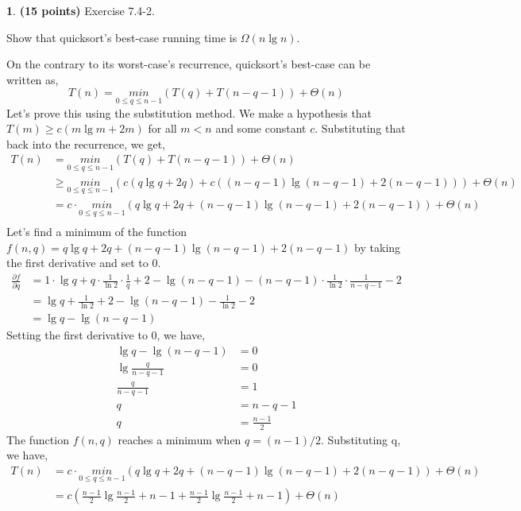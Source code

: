 \documentclass[11pt]{article}
\theoremstyle{definition}
\theoremstyle{theorem}
\newtheorem{prob}{}
\newcommand{\solution}{\medskip\noindent{\color{DarkBlue}\textbf{Solution:}}}
\begin{document}
\newpage
\begin{prob} \textbf{(15 points)} Exercise 7.4-2.

Show that quicksort’s best-case running time is $\Omega{(n\lg n)}$.

\solution

On the contrary to its worst-case's recurrence, quicksort's best-case can be written as,
\[
T(n) = \underset{0 \leq q \leq n-1}{min} (T(q) + T(n-q-1)) + \Theta{(n)}
\]
Let's prove this using the substitution method. We make a hypothesis that $T(m) \ge c(m\lg m + 2m)$ for all $m < n$ and some constant $c$. Substituting that back into the recurrence, we get,
\[
\begin{split}
T(n) &= \underset{0 \leq q \leq n-1}{min} (T(q) + T(n-q-1)) + \Theta{(n)} \\
& \ge \underset{0 \leq q \leq n-1}{min} (c (q\lg q + 2q) + c ((n-q-1) \lg (n-q-1) + 2 (n-q-1))) + \Theta{(n)} \\
& = c \cdot \underset{0 \leq q \leq n-1}{min} (q\lg q + 2q + (n-q-1) \lg (n-q-1) + 2 (n-q-1)) + \Theta{(n)} \\
\end{split}
\]
Let's find a minimum of the function $f(n, q) = q\lg q + 2q + (n-q-1) \lg (n-q-1) + 2 (n-q-1)$ by taking the first derivative and set to 0.
\[
\begin{split}
\frac{\partial f}{\partial q} &= 1 \cdot \lg q + q \cdot \frac{1}{\ln 2} \cdot \frac{1}{q} + 2 - \lg(n-q-1) - (n-q-1) \cdot  \frac{1}{\ln 2} \cdot \frac{1}{n-q-1} - 2 \\
& = \lg q + \frac{1}{\ln 2} + 2 - \lg(n-q-1) - \frac{1}{\ln 2} - 2 \\
& = \lg q - \lg(n-q-1)
\end{split}
\]
Setting the first derivative to 0, we have,
\[
\begin{split}
\lg q - \lg(n-q-1) &= 0 \\
\lg \frac{q}{n-q-1} &= 0 \\
 \frac{q}{n-q-1} &= 1 \\
 q &= n - q - 1 \\
 q &= \frac{n-1}{2}
\end{split}
\]
The function $f(n, q)$ reaches a minimum when $q = (n-1)/2$. Substituting q, we have,
\[
\begin{split}
T(n) &= c \cdot \underset{0 \leq q \leq n-1}{min} (q\lg q + 2q + (n-q-1) \lg (n-q-1) + 2 (n-q-1)) + \Theta{(n)} \\
&= c (\frac{n-1}{2} \lg \frac{n-1}{2} + n - 1 + \frac{n-1}{2} \lg \frac{n-1}{2} + n - 1) + \Theta{(n)} \\

\end{split}\]
\end{prob}
\end{document}

